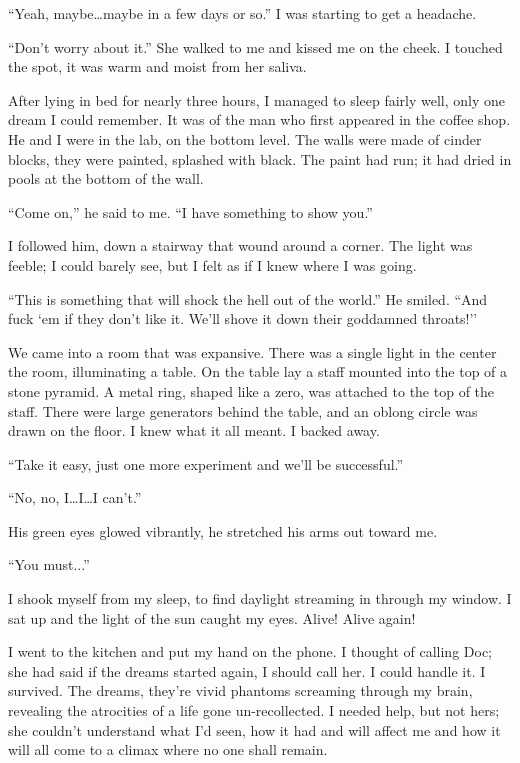 ``Yeah, maybe\ldots maybe in a few days or so.'' I was starting to get a
headache.

``Don't worry about it.'' She walked to me and kissed me on the cheek. I
touched the spot, it was warm and moist from her saliva.

After lying in bed for nearly three hours, I managed to sleep fairly
well, only one dream I could remember. It was of the man who first
appeared in the coffee shop. He and I were in the lab, on the bottom
level. The walls were made of cinder blocks, they were painted, splashed
with black. The paint had run; it had dried in pools at the bottom of
the wall.

``Come on,'' he said to me. ``I have something to show you.''

I followed him, down a stairway that wound around a corner. The light
was feeble; I could barely see, but I felt as if I knew where I was
going.

``This is something that will shock the hell out of the world.'' He
smiled. ``And fuck `em if they don't like it. We'll shove it down their
goddamned throats!''

We came into a room that was expansive. There was a single light in the
center the room, illuminating a table. On the table lay a staff mounted
into the top of a stone pyramid. A metal ring, shaped like a zero, was
attached to the top of the staff. There were large generators behind the
table, and an oblong circle was drawn on the floor. I knew what it all
meant. I backed away.

``Take it easy, just one more experiment and we'll be successful.''

``No, no, I\ldots I\ldots I can't.''

His green eyes glowed vibrantly, he stretched his arms out toward me.

``You must...''

I shook myself from my sleep, to find daylight streaming in through my
window. I sat up and the light of the sun caught my eyes. Alive! Alive
again!

I went to the kitchen and put my hand on the phone. I thought of calling
Doc; she had said if the dreams started again, I should call her. I
could handle it. I survived. The dreams, they're vivid phantoms
screaming through my brain, revealing the atrocities of a life gone
un-recollected. I needed help, but not hers; she couldn't understand
what I'd seen, how it had and will affect me and how it will all come to
a climax where no one shall remain.

